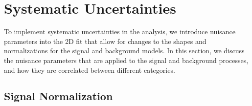 
\clearpage

\section{Systematic Uncertainties}
\label{sec:uncert}

To implement systematic uncertainties in the analysis, we introduce nuisance parameters into the 2D fit that allow for changes to the shapes and normalizations for the signal and background models.
In this section, we discuss the nuisance parameters that are applied to the signal and background processes, and how they are correlated between different categories.

\subsection{Signal Normalization}

